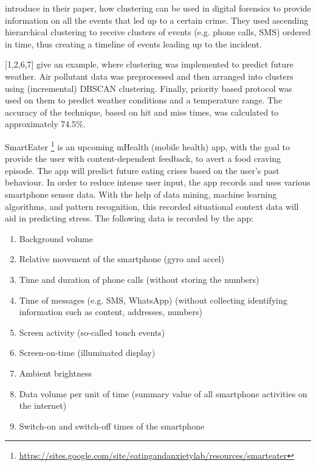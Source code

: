 \textcite{forensics} introduce in their paper, how clustering can be used in digital forensics to provide information on all the events that led up to a certain crime. They used ascending hierarchical clustering to receive clusters of events (e.g. phone calls, SMS) ordered in time, thus creating a timeline of events leading up to the incident.

\textcite{convexhullDbscan}[1,2,6,7] give an example, where clustering was implemented to predict future weather. Air pollutant data was preprocessed and then arranged into clusters using (incremental) DBSCAN clustering. Finally, priority based protocol was used on them to predict weather conditions and a temperature range. The accuracy of the technique, based on hit and miss times, was calculated to approximately 74.5\%.


SmartEater \footnote{\url{https://sites.google.com/site/eatingandanxietylab/resources/smarteater}} is an upcoming mHealth (mobile health) app, with the goal to provide the user with content-dependent feedback, to avert a food craving episode. The app will predict future eating crises based on the user's past behaviour. In order to reduce intense user input, the app records and uses various smartphone sensor data.  With the help of data mining, machine learning algorithms, and pattern recognition, this recorded situational context data will aid in predicting stress. The following data is recorded by the app:

\begin{enumerate}
	\item Background volume
	\item Relative movement of the smartphone (gyro and accel)
	\item Time and duration of phone calls (without storing the numbers)
	\item Time of messages (e.g. SMS, WhatsApp) (without collecting identifying information such as content, addresses, numbers)
	\item Screen activity (so-called touch events)
	\item Screen-on-time (illuminated display)
	\item Ambient brightness
	\item Data volume per unit of time (summary value of all smartphone activities on the internet)
	\item Switch-on and switch-off times of the smartphone
\end{enumerate}


